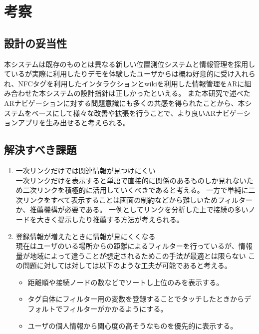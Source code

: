 \section{考察}

\subsection{設計の妥当性}
本システムは既存のものとは異なる新しい位置測位システムと情報管理を採用しているが実際に利用したりデモを体験したユーザからは概ね好意的に受け入れられ、NFCタグを利用したインタラクションとwikiを利用した情報管理をARに組み合わせた本システムの設計指針は正しかったといえる。
また本研究で述べたARナビゲーションに対する問題意識にも多くの共感を得られたことから、本システムをベースにして様々な改善や拡張を行うことで、より良いARナビゲーションアプリを生み出せると考えられる。

\subsection{解決すべき課題}

\begin{enumerate}
  \item 一次リンクだけでは関連情報が見つけにくい\\
  一次リンクだけを表示すると単語で直接的に関係のあるものしか見れないため二次リンクを積極的に活用していくべきであると考える。
  一方で単純に二次リンクをすべて表示することは画面の制約などから難しいためフィルターか、推薦機構が必要である。
  一例としてリンクを分析した上で接続の多いノードを大きく提示したり推薦する方法が考えられる。
  \item 登録情報が増えたときに情報が見にくくなる\\
  現在はユーザのいる場所からの距離によるフィルターを行っているが、情報量が地域によって違うことが想定されるためこの手法が最適とは限らない
  この問題に対しては対しては以下のような工夫が可能であると考える。
  \begin{itemize}
    \item 距離順や接続ノードの数などでソートし上位のみを表示する。
    \item タグ自体にフィルター用の変数を登録することでタッチしたときからデフォルトでフィルターがかかるようにする。
    \item ユーザの個人情報から関心度の高そうなものを優先的に表示する。
  \end{itemize}
   
\end{enumerate}

